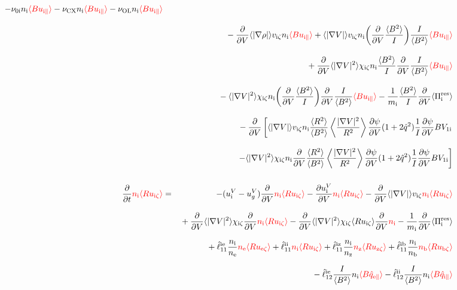 \documentclass[11pt]{article}
\def\r#1{{\rm#1}}
\def\ave#1{\left\langle#1\right\rangle}
\def\aves#1{\langle#1\rangle}
\def\dd#1#2{\frac{\partial #1}{\partial #2}}
\def\para{\parallel}
\def\ddV{\frac{\partial}{\partial V}}
\def\ddt{\frac{\partial}{\partial t}}
\def\mi{m_\r{i}}
\def\nee{n_\r{e}}
\def\ni{n_\r{i}}
\def\nz{n_\r{z}}
\def\nb{n_\r{b}}
\def\uzt#1{u_{\r{#1}\zeta}}
\def\upara#1{u_{\r{#1}\para}}
\def\qhatpara#1{\hat{q}_{\r{#1}\para}}
\def\uV#1{u_\r{#1}^V}
\def\ugV{u_{g}^V}
\def\chis#1{\chi_\r{#1}}
\def\nun#1{\nu_\r{0#1}}
\def\nuCX{\nu_\r{CX}}
\def\nuOL{\nu_\r{OL}}
\def\red#1{\textcolor{red}{#1}}
\begin{document}
\begin{eqnarray}
%
  - \nun{i} \ni \red{\aves{B \upara{i}}}
%
  - \nuCX \ni \red{\aves{B \upara{i}}}
%
  - \nuOL \ni \red{\aves{B \upara{i}}}
\nonumber\\[3mm]&&{}
%
  - \ddV \aves{|\nabla \rho|} v_{\r{i}\zeta} \ni \red{\aves{B \upara{i}}}
%
  + \aves{|\nabla V|} v_{\r{i}\zeta} \ni 
  \biggl(\ddV \frac{\aves{B^2}}{I} \biggl) \frac{I}{\aves{B^2}} \red{\aves{B \upara{i}}}
\nonumber\\[3mm]&&{}
%
  + \ddV \aves{|\nabla V|^2} \chis{i\zeta} \ni
  \frac{\aves{B^2}}{I} \ddV \frac{I}{\aves{B^2}} \red{\aves{B \upara{i}}}
\nonumber\\[3mm]&&{}
%
  - \aves{|\nabla V|^2} \chis{i\zeta} \ni \biggl( \ddV
  \frac{\aves{B^2}}{I} \biggr) \ddV \frac{I}{\aves{B^2}} \red{\aves{B \upara{i}}}
%
  - \frac{1}{\mi} \frac{\aves{B^2}}{I} \ddV \aves{\Pi_\r{i}^\r{res}}
\nonumber\\[3mm]&&{}
%
  - \ddV
    \left[  \aves{|\nabla V|} v_{\r{i}\zeta} \ni
            \frac{\aves{R^2}}{\aves{B^2}}\ave{\frac{|\nabla V|^2}{R^2}}\dd{\psi}{V}(1+2\hat{q}^2)
	    \frac{1}{I} \dd{\psi}{V} BV_{1\r{i}} \right.
\nonumber\\[3mm]&&{}
    \left.- \aves{|\nabla V|^2} \chis{i\zeta} \ni
          \ddV \frac{\aves{R^2}}{\aves{B^2}}\ave{\frac{|\nabla V|^2}{R^2}}\dd{\psi}{V}(1+2\hat{q}^2)
	  \frac{1}{I} \dd{\psi}{V} BV_{1\r{i}}\right]
\\[5mm]
  \ddt \red{\ni \aves{R \uzt{i}}} &=&
%
  - (\uV{i} - \ugV) \ddV \red{\ni \aves{R \uzt{i}}}
%
  - \dd{\uV{i}}{V} \red{\ni \aves{R \uzt{i}}}
%
  - \ddV \aves{|\nabla V|} v_{\r{i}\zeta} \red{\ni \aves{R \uzt{i}}}
\nonumber\\[3mm]&&{}
  + \ddV \aves{|\nabla V|^2} \chis{i\zeta} \ddV \red{\ni \aves{R \uzt{i}}}
  - \ddV \aves{|\nabla V|^2} \chis{i\zeta} \aves{R \uzt{i}}\ddV \red{\ni} 
  - \frac{1}{\mi} \ddV \aves{\Pi_\r{i}^\r{res}}
\nonumber\\[2.5mm]&&{}
%
  + \hat{\ell}_{11}^\r{ie} \frac{\ni}{\nee} \red{\nee \aves{R \uzt{e}}}
  + \hat{\ell}_{11}^\r{ii}                  \red{\ni  \aves{R \uzt{i}}}
  + \hat{\ell}_{11}^\r{iz} \frac{\ni}{\nz}  \red{\nz  \aves{R \uzt{z}}}
  + \hat{\ell}_{11}^\r{ib} \frac{\ni}{\nb}  \red{\nb  \aves{R \uzt{b}}}
\nonumber\\[2.5mm]&&{}
%
  - \hat{\ell}_{12}^\r{ie} \frac{I}{\aves{B^2}} \ni \red{\aves{B \qhatpara{e}}}
  - \hat{\ell}_{12}^\r{ii} \frac{I}{\aves{B^2}} \ni \red{\aves{B \qhatpara{i}}}

\end{eqnarray}
\end{document}
